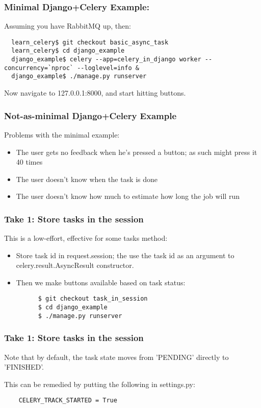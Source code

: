 \documentclass[9pt]{beamer}
\begin{document}
\begin{frame}[fragile]
  \frametitle{Minimal Django+Celery Example:}
  Assuming you have RabbitMQ up, then:
  \begin{verbatim}
  learn_celery$ git checkout basic_async_task
  learn_celery$ cd django_example
  django_example$ celery --app=celery_in_django worker --concurrency=`nproc` --loglevel=info &
  django_example$ ./manage.py runserver
  \end{verbatim}
  Now navigate to 127.0.0.1:8000, and start hitting buttons.
\end{frame}

\begin{frame}[fragile]
  \frametitle{Not-as-minimal Django+Celery Example}
  Problems with the minimal example:
  \begin{itemize}
  \item The user gets no feedback when he's pressed a button; as such might press it 40 times
    \pause
  \item The user doesn't know when the task is done
    \pause
  \item The user doesn't know how much to estimate how long the job will run
  \end{itemize}
\end{frame}

\begin{frame}[fragile]
  \frametitle{Take 1: Store tasks in the session}
  This is a low-effort, effective for some tasks method:
  \begin{itemize}
  \item Store task id in request.session; the use the task id as an argument to celery.result.AsyncResult constructor.
    \pause
  \item Then we make buttons available based on task status:
    \begin{verbatim}
      $ git checkout task_in_session
      $ cd django_example
      $ ./manage.py runserver
    \end{verbatim}
  \end{itemize}
\end{frame}

\begin{frame}[fragile]
  \frametitle{Take 1: Store tasks in the session}
  Note that by default, the task state moves from 'PENDING' directly to 'FINISHED'.

  This can be remedied by putting the following in settings.py:
  \begin{verbatim}
    CELERY_TRACK_STARTED = True
  \end{verbatim}
\end{frame}
\end{document}
